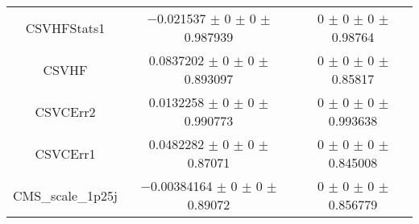 \begin{table}
\begin{tabular}{ccc}
CSVHFStats1 	& \num{-0.021537} $\pm$ \num{0} $\pm$ \num{0} $\pm$ \num{0.987939} 	& \num{0} $\pm$ \num{0} $\pm$ \num{0} $\pm$ \num{0.98764}\\
CSVHF 	& \num{0.0837202} $\pm$ \num{0} $\pm$ \num{0} $\pm$ \num{0.893097} 	& \num{0} $\pm$ \num{0} $\pm$ \num{0} $\pm$ \num{0.85817}\\
CSVCErr2 	& \num{0.0132258} $\pm$ \num{0} $\pm$ \num{0} $\pm$ \num{0.990773} 	& \num{0} $\pm$ \num{0} $\pm$ \num{0} $\pm$ \num{0.993638}\\
CSVCErr1 	& \num{0.0482282} $\pm$ \num{0} $\pm$ \num{0} $\pm$ \num{0.87071} 	& \num{0} $\pm$ \num{0} $\pm$ \num{0} $\pm$ \num{0.845008}\\
CMS\_scale\_1p25j 	& \num{-0.00384164} $\pm$ \num{0} $\pm$ \num{0} $\pm$ \num{0.89072} 	& \num{0} $\pm$ \num{0} $\pm$ \num{0} $\pm$ \num{0.856779}\\
\bottomrule
\end{tabular}
\end{table}